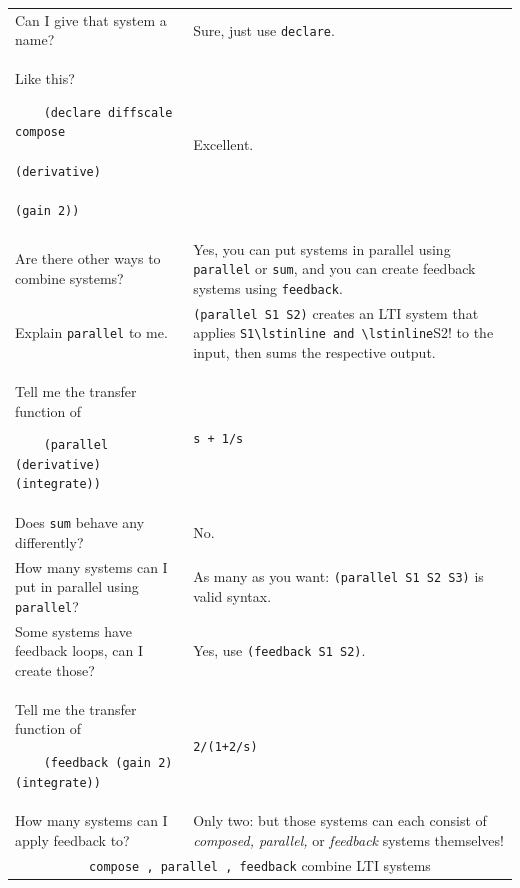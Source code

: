 \documentclass[11pt,letter]{article}
\begin{document}
\begin{longtable}{ p{} p{} }
  Can I give that system a name?
  &
  Sure, just use \lstinline!declare!. \\

  Like this?
  \begin{lstlisting}
    (declare diffscale compose
                         (derivative)
                         (gain 2))
  \end{lstlisting}
  &
  Excellent. \\

  Are there other ways to combine systems?
  &
  Yes, you can put systems in parallel using \lstinline!parallel! or \lstinline!sum!, and you can create feedback systems using \lstinline!feedback!. \\

  Explain \lstinline!parallel! to me.
  &
  \lstinline!(parallel S1 S2)! creates an LTI system that applies \lstinline!S1\lstinline and \lstinline!S2! to the input, then sums the respective output. \\

  Tell me the transfer function of
  \begin{lstlisting}
    (parallel (derivative) (integrate))
  \end{lstlisting}
  &
  \lstinline!s + 1/s! \\

  Does \lstinline!sum! behave any differently?
  &
  No. \\

  How many systems can I put in parallel using \lstinline!parallel!?
  &
  As many as you want: \lstinline!(parallel S1 S2 S3)! is valid syntax. \\

  Some systems have feedback loops, can I create those?
  &
  Yes, use \lstinline!(feedback S1 S2)!. \\

  Tell me the transfer function of
  \begin{lstlisting}
    (feedback (gain 2) (integrate))
  \end{lstlisting}
  &
  \lstinline!2/(1+2/s)! \\

  How many systems can I apply feedback to?
  &
  Only two: but those systems can each consist of \emph{composed, parallel,} or \emph{feedback} systems themselves! \\

  \midrule

  \multicolumn{2}{c}{\Large\lstinline!compose , parallel , feedback! combine LTI systems} \\


\end{longtable}
\end{document}
